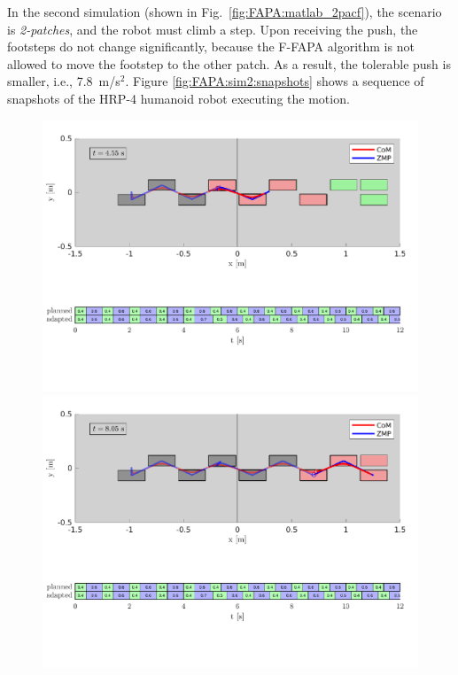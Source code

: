In the second simulation (shown in Fig.~\ref{fig:FAPA:matlab_2pacf}), the scenario is {\em 2-patches}, and the robot must climb a step. Upon receiving the push, the footsteps do not change significantly, because the F-FAPA algorithm is not allowed to move the footstep to the other patch. As a result, the tolerable push is smaller, i.e., 7.8~m/s$^2$. Figure \ref{fig:FAPA:sim2:snapshots} shows a sequence of snapshots of the HRP-4 humanoid robot executing the motion.
\begin{figure}
    \centering
    \includegraphics[trim={0 5.9cm 0 0.7cm},clip,width=\textwidth]{figures/two-patches-fixed-plot-after-push.pdf}
    \includegraphics[trim={0 5.9cm 0 0.7cm},clip,width=\textwidth]{figures/two-patches-fixed-completing-task.pdf}

\end{figure}

